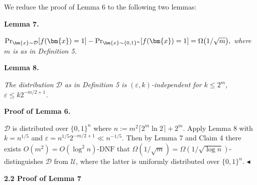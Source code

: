 


We reduce the proof of Lemma 6 to the following two lemmas:\par





\par\medskip\noindent\textbf{
\textbf{Lemma 7}\textbf{.}
}\par



$\Pr_{\bm{x}\sim\mathcal{D}}[f(\bm{x})=1]-\Pr_{\bm{x}\sim\{0,1\}^{n}}[f(\bm{x})=1]=\Omega\big{(}1/\sqrt{m}\big{)},$\emph{
where $m$ is as in Definition 5.}\par







\par\medskip\noindent\textbf{
\textbf{Lemma 8}\textbf{.}
}\par



\emph{The distribution $\mathcal{D}$ as in Definition 5 is $(\varepsilon,k)$-independent for $k\leq 2^{m}$, $\varepsilon\leq k2^{-m/2+1}$.}\par







\par\medskip\noindent\textbf{Proof of Lemma 6.}\par




$\mathcal{D}$ is distributed over $\{0,1\}^{n}$ where $n:=m^{2}\lceil 2^{m}\ln 2\rceil+2^{m}$. Apply Lemma 8 with $k=n^{1/5}$ and $\varepsilon=n^{1/5}2^{-m/2+1}\ll n^{-1/5}$. Then by Lemma 7 and Claim 4 there exists $O(m^{2})=O(\log^{2}n)$-$\mathrm{DNF}$ that $\Omega(1/\sqrt{m})=\Omega(1/\sqrt{\log n})$-distinguishes $\mathcal{D}$ from $\mathcal{U}$, where the latter is uniformly distributed over $\{0,1\}^{n}$.
$\blacktriangleleft$\par






\par\medskip\noindent\textbf{
2.2 Proof of Lemma 7
}\par




